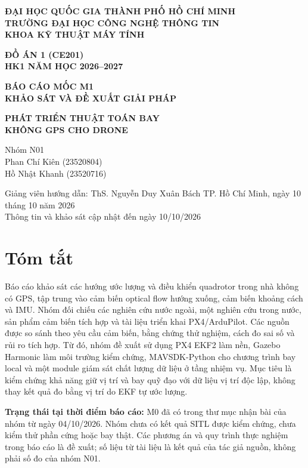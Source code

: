 \documentclass[a4paper,12pt]{article}
\begin{document}
\hypersetup{pageanchor=false}
\begin{titlepage}
\centering
\textbf{ĐẠI HỌC QUỐC GIA THÀNH PHỐ HỒ CHÍ MINH}\\
\textbf{TRƯỜNG ĐẠI HỌC CÔNG NGHỆ THÔNG TIN}\\
\textbf{KHOA KỸ THUẬT MÁY TÍNH}
\vspace{2.0cm}

\textbf{ĐỒ ÁN 1 (CE201)}\\
\textbf{HK1 NĂM HỌC 2026--2027}
\vspace{1.2cm}

\textbf{BÁO CÁO MỐC M1}\\
\textbf{KHẢO SÁT VÀ ĐỀ XUẤT GIẢI PHÁP}
\vspace{0.8cm}

\textbf{PHÁT TRIỂN THUẬT TOÁN BAY}\\
\textbf{KHÔNG GPS CHO DRONE}
\vspace{1.5cm}

Nhóm N01\\
Phan Chí Kiên (23520804)\\
Hồ Nhật Khanh (23520716)
\vspace{0.8cm}

Giảng viên hướng dẫn: ThS. Nguyễn Duy Xuân Bách
\vfill
TP. Hồ Chí Minh, ngày 10 tháng 10 năm 2026\\
Thông tin và khảo sát cập nhật đến ngày 10/10/2026
\end{titlepage}
\hypersetup{pageanchor=true}
\section*{Tóm tắt}
Báo cáo khảo sát các hướng ước lượng và điều khiển quadrotor trong nhà không có GPS, tập trung vào cảm biến optical flow hướng xuống, cảm biến khoảng cách và IMU. Nhóm đối chiếu các nghiên cứu nước ngoài, một nghiên cứu trong nước, sản phẩm cảm biến tích hợp và tài liệu triển khai PX4/ArduPilot. Các nguồn được so sánh theo yêu cầu cảm biến, bằng chứng thử nghiệm, cách đo sai số và rủi ro tích hợp. Từ đó, nhóm đề xuất sử dụng PX4 EKF2 làm nền, Gazebo Harmonic làm môi trường kiểm chứng, MAVSDK-Python cho chương trình bay local và một module giám sát chất lượng dữ liệu ở tầng nhiệm vụ. Mục tiêu là kiểm chứng khả năng giữ vị trí và bay quỹ đạo với dữ liệu vị trí độc lập, không thay kết quả đo bằng vị trí do EKF tự ước lượng.

\textbf{Trạng thái tại thời điểm báo cáo:} M0 đã có trong thư mục nhận bài của nhóm từ ngày 04/10/2026. Nhóm chưa có kết quả SITL được kiểm chứng, chưa kiểm thử phần cứng hoặc bay thật. Các phương án và quy trình thực nghiệm trong báo cáo là đề xuất; số liệu từ tài liệu là kết quả của tác giả nguồn, không phải số đo của nhóm N01.
\end{document}
